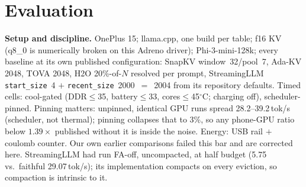 \documentclass[sigconf,10pt]{acmart}
\begin{document}
\section{Evaluation}
\label{sec:eval}
\textbf{Setup and discipline.} OnePlus 15; llama.cpp, one build per table; f16 KV (q8\_0 is numerically broken on this Adreno driver); Phi-3-mini-128k; every baseline at its own published configuration: SnapKV window~32/pool~7, Ada-KV 2048, TOVA 2048, H2O 20\%-of-$N$ resolved per prompt, StreamingLLM \texttt{start\_size}~4 $+$ \texttt{recent\_size}~2000~$=$~2004 from its repository defaults. Timed cells: cool-gated (DDR$\le$35, battery$\le$33, cores$\le$45$^\circ$C; charging off), scheduler-pinned. Pinning matters: unpinned, identical GPU runs spread 28.2--39.2\,tok/s (scheduler, not thermal); pinning collapses that to 3\%, so any phone-GPU ratio below $1.39\times$ published without it is inside the noise. Energy: USB rail $+$ coulomb counter. Our own earlier comparisons failed this bar and are corrected here. StreamingLLM had run FA-off, uncompacted, at half budget (5.75 vs.\ faithful 29.07\,tok/s); its implementation compacts on every eviction, so compaction is intrinsic to it.
\end{document}

